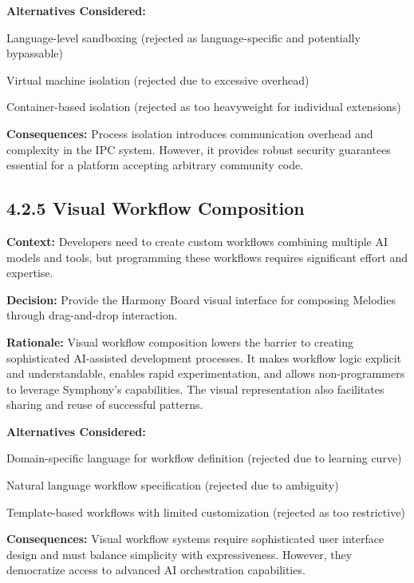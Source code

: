 \textbf{Alternatives Considered:}
\begin{compactlist}
    \item Language-level sandboxing (rejected as language-specific and potentially bypassable)
    \item Virtual machine isolation (rejected due to excessive overhead)
    \item Container-based isolation (rejected as too heavyweight for individual extensions)
\end{compactlist}

\textbf{Consequences:} Process isolation introduces communication overhead and complexity in the IPC system. However, it provides robust security guarantees essential for a platform accepting arbitrary community code.

\subsection*{4.2.5 Visual Workflow Composition}

\textbf{Context:} Developers need to create custom workflows combining multiple AI models and tools, but programming these workflows requires significant effort and expertise.

\textbf{Decision:} Provide the Harmony Board visual interface for composing Melodies through drag-and-drop interaction.

\textbf{Rationale:} Visual workflow composition lowers the barrier to creating sophisticated AI-assisted development processes. It makes workflow logic explicit and understandable, enables rapid experimentation, and allows non-programmers to leverage Symphony's capabilities. The visual representation also facilitates sharing and reuse of successful patterns.

\textbf{Alternatives Considered:}
\begin{compactlist}
    \item Domain-specific language for workflow definition (rejected due to learning curve)
    \item Natural language workflow specification (rejected due to ambiguity)
    \item Template-based workflows with limited customization (rejected as too restrictive)
\end{compactlist}

\textbf{Consequences:} Visual workflow systems require sophisticated user interface design and must balance simplicity with expressiveness. However, they democratize access to advanced AI orchestration capabilities.

